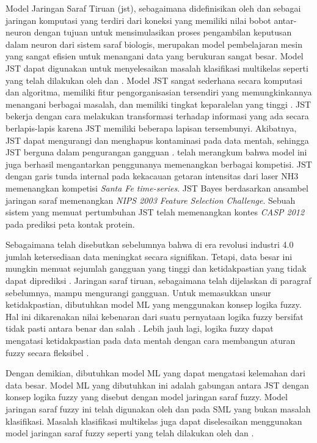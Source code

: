 \noindent Model Jaringan Saraf Tiruan (\gls{jst}), sebagaimana didefinisikan oleh  dan  sebagai jaringan komputasi yang terdiri dari koneksi yang memiliki nilai bobot antar-neuron dengan tujuan untuk mensimulasikan proses pengambilan keputusan dalam neuron dari sistem saraf biologis, merupakan model pembelajaran mesin yang sangat efisien untuk menangani data yang berukuran sangat besar. Model JST dapat digunakan untuk menyelesaikan masalah klasifikasi multikelas seperti yang telah dilakukan oleh  dan . Model JST sangat sederhana secara komputasi dan algoritma, memiliki fitur pengorganisasian tersendiri yang memungkinkannya menangani berbagai masalah, dan memiliki tingkat keparalelan yang tinggi \cite{dgrau}. JST bekerja dengan cara melakukan transformasi terhadap informasi yang ada secara berlapis-lapis karena JST memiliki beberapa lapisan tersembunyi. Akibatnya, JST dapat mengurangi dan menghapus kontaminasi pada data mentah, sehingga JST berguna dalam pengurangan gangguan \cite{deng}.  telah merangkum bahwa model ini juga berhasil mengantarkan penggunanya memenangkan berbagai kompetisi. JST dengan garis tunda internal pada kekacauan getaran intensitas dari laser NH3 memenangkan kompetisi \emph{Santa Fe time-series}. JST Bayes berdasarkan ansambel jaringan saraf memenangkan \emph{NIPS 2003 Feature Selection Challenge}. Sebuah sistem yang memuat pertumbuhan JST telah memenangkan kontes \emph{CASP 2012} pada prediksi peta kontak protein.

\noindent Sebagaimana telah disebutkan sebelumnya bahwa di era revolusi industri 4.0 jumlah ketersediaan data meningkat secara signifikan. Tetapi, data besar ini mungkin memuat sejumlah gangguan yang tinggi dan ketidakpastian yang tidak dapat diprediksi \cite{deng}. Jaringan saraf tiruan, sebagaimana telah dijelaskan di paragraf sebelumnya, mampu mengurangi gangguan. Untuk memasukkan unsur ketidakpastian, dibutuhkan model ML yang menggunakan konsep logika fuzzy. Hal ini dikarenakan nilai kebenaran dari suatu pernyataan logika fuzzy bersifat tidak pasti antara benar dan salah \cite{zadeh}. Lebih jauh lagi, logika fuzzy dapat mengatasi ketidakpastian pada data mentah dengan cara membangun aturan fuzzy secara fleksibel \cite{deng}.

\noindent Dengan demikian, dibutuhkan model ML yang dapat mengatasi kelemahan dari data besar. Model ML yang dibutuhkan ini adalah gabungan antara JST dengan konsep logika fuzzy yang disebut dengan model jaringan saraf fuzzy. Model jaringan saraf fuzzy ini telah digunakan oleh  dan  pada SML yang bukan masalah klasifikasi. Masalah klasifikasi multikelas juga dapat diselesaikan menggunakan model jaringan saraf fuzzy seperti yang telah dilakukan oleh  dan .

